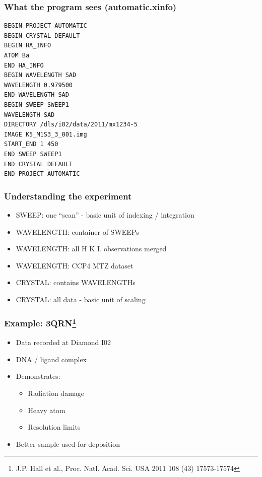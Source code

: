 \documentclass[slides,compress]{beamer}
\begin{document}
\begin{frame}[fragile]
\frametitle{What the program sees (automatic.xinfo)}
{\small
\begin{verbatim}
BEGIN PROJECT AUTOMATIC
BEGIN CRYSTAL DEFAULT
BEGIN HA_INFO
ATOM Ba
END HA_INFO
BEGIN WAVELENGTH SAD
WAVELENGTH 0.979500
END WAVELENGTH SAD
BEGIN SWEEP SWEEP1
WAVELENGTH SAD
DIRECTORY /dls/i02/data/2011/mx1234-5
IMAGE K5_M1S3_3_001.img
START_END 1 450
END SWEEP SWEEP1
END CRYSTAL DEFAULT
END PROJECT AUTOMATIC
\end{verbatim}
}
\end{frame}

\begin{frame}
\frametitle{Understanding the experiment}
\begin{itemize}
\item{SWEEP: one ``scan'' - basic unit of indexing / integration}
\item{WAVELENGTH: container of SWEEPs}
\item{WAVELENGTH: all H K L observations merged}
\item{WAVELENGTH: CCP4 MTZ dataset}
\item{CRYSTAL: contains WAVELENGTHs}
\item{CRYSTAL: all data - basic unit of scaling}
\end{itemize}
\end{frame}

\begin{frame}
\frametitle{Example: 3QRN\footnote{J.P. Hall et al., Proc. Natl. Acad. Sci. USA 2011 108 (43) 17573-17574}}
\begin{itemize}
\item{Data recorded at Diamond I02}
\item{DNA / ligand complex}
\item{Demonstrates:
\begin{itemize}
\item{Radiation damage}
\item{Heavy atom}
\item{Resolution limits}
\end{itemize}
}
\item{Better sample used for deposition}
\end{itemize}
\end{frame}
\end{document}
